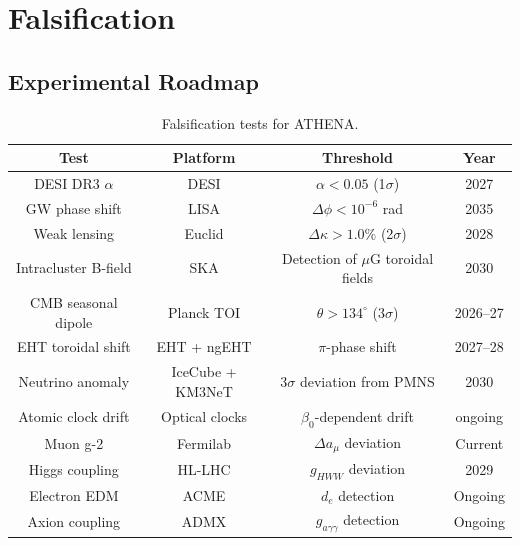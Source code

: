 \documentclass[12pt,oneside]{book}
\begin{document}
\chapter{Falsification}

\section{Experimental Roadmap}

\begin{table}[H]
\centering
\begin{tabular}{|c|c|c|c|}
\hline
\textbf{Test} & \textbf{Platform} & \textbf{Threshold} & \textbf{Year} \\
\hline
DESI DR3 $\alpha$ & DESI & $\alpha < 0.05$ (1$\sigma$) & 2027 \\
GW phase shift & LISA & $\Delta\phi < 10^{-6}$ rad & 2035 \\
Weak lensing & Euclid & $\Delta\kappa > 1.0\%$ (2$\sigma$) & 2028 \\
Intracluster B-field & SKA & Detection of $\mu$G toroidal fields & 2030 \\
CMB seasonal dipole & Planck TOI & $\theta > 134^\circ$ (3$\sigma$) & 2026--27 \\
EHT toroidal shift & EHT + ngEHT & $\pi$-phase shift & 2027--28 \\
Neutrino anomaly & IceCube + KM3NeT & 3$\sigma$ deviation from PMNS & 2030 \\
Atomic clock drift & Optical clocks & $\beta_0$-dependent drift & ongoing \\
Muon g-2 & Fermilab & $\Delta a_\mu$ deviation & Current \\
Higgs coupling & HL-LHC & $g_{HWW}$ deviation & 2029 \\
Electron EDM & ACME & $d_e$ detection & Ongoing \\
Axion coupling & ADMX & $g_{a\gamma\gamma}$ detection & Ongoing \\
\hline
\end{tabular}
\caption{Falsification tests for ATHENA.}
\end{table}
\end{document}
